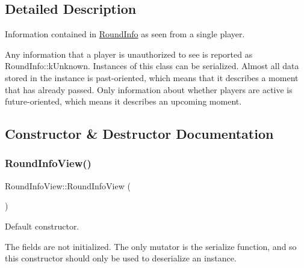 \subsection{Detailed Description}
Information contained in {\ttfamily \hyperlink{classroundinfo_1_1_round_info}{Round\+Info}} as seen from a single player. 

Any information that a player is unauthorized to see is reported as {\ttfamily Round\+Info\+::k\+Unknown}. Instances of this class can be serialized. Almost all data stored in the instance is past-\/oriented, which means that it describes a moment that has already passed. Only information about whether players are active is future-\/oriented, which means it describes an upcoming moment. 

\subsection{Constructor \& Destructor Documentation}
\mbox{\label{classroundinfo_1_1_round_info_view_a29937c9ac9cd71b7edd10f612ce76c91}} 
\subsubsection{\texorpdfstring{Round\+Info\+View()}{RoundInfoView()}\hspace{0.1cm}{\footnotesize\ttfamily [1/2]}}
{\footnotesize\ttfamily Round\+Info\+View\+::\+Round\+Info\+View (\begin{DoxyParamCaption}{ }\end{DoxyParamCaption})}



Default constructor. 

The fields are not initialized. The only mutator is the {\ttfamily serialize} function, and so this constructor should only be used to deserialize an instance. \mbox{\label{classroundinfo_1_1_round_info_view_a8c5bca173f30cc869505c36baf04ebaa}} 
